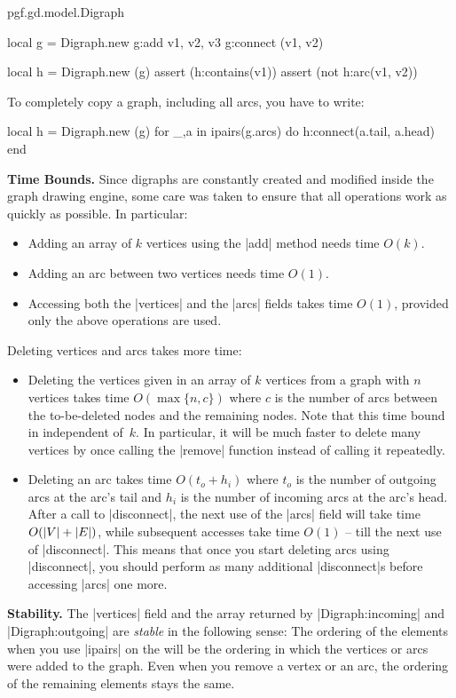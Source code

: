 \begin{luaclass}{pgf.gd.model.}{Digraph}
\begin{codeexample}
local g = Digraph.new {}
g:add { v1, v2, v3 }
g:connect (v1, v2)

local h = Digraph.new (g)
assert (h:contains(v1))
assert (not h:arc(v1, v2))
\end{codeexample}

  To completely copy a graph, including all arcs, you have to write:
\begin{codeexample}
local h = Digraph.new (g)
for _,a in ipairs(g.arcs) do h:connect(a.tail, a.head) end
\end{codeexample}

  \medskip
  \noindent\textbf{Time Bounds.}
  Since digraphs are constantly created and modified inside the graph
  drawing engine, some care was taken to ensure that all operations
  work as quickly as possible. In particular:
  \begin{itemize}
  \item Adding an array of $k$ vertices using the |add| method needs
    time $O(k)$.
  \item Adding an arc between two vertices needs time $O(1)$.
  \item Accessing both the |vertices| and the |arcs| fields takes time
    $O(1)$, provided only the above operations are used.
  \end{itemize}
  Deleting vertices and arcs takes more time:
  \begin{itemize}
  \item Deleting the vertices given in an array of $k$ vertices from a
    graph with $n$ vertices takes time $O(\max\{n,c\})$ where $c$ is the
    number of arcs between the to-be-deleted nodes and the remaining
    nodes. Note that this time bound in independent of~$k$. In
    particular, it will be much faster to delete many vertices by once
    calling the |remove| function instead of calling it repeatedly.
  \item Deleting an arc takes time $O(t_o+h_i)$ where $t_o$ is the
    number of outgoing arcs at the arc's tail and $h_i$ is the number
    of incoming arcs at the arc's head. After a call to |disconnect|,
    the next use of the |arcs| field will take time $\catcode`\|=12
    O(|V| + |E|)$, while subsequent accesses take time $O(1)$ -- till the
    next use of |disconnect|. This means that once you start deleting
    arcs using |disconnect|, you should perform as many additional
    |disconnect|s before accessing |arcs| one more.
  \end{itemize}
  
  \medskip
  \noindent\textbf{Stability.} The |vertices| field and the array
  returned by |Digraph:incoming| and |Digraph:outgoing| are
  \emph{stable} in the following sense: The ordering of the elements
  when you use |ipairs| on the will be the ordering in which the
  vertices or arcs were added to the graph. Even when you remove a
  vertex or an arc, the ordering of the remaining elements stays the
  same. 
\end{luaclass}




